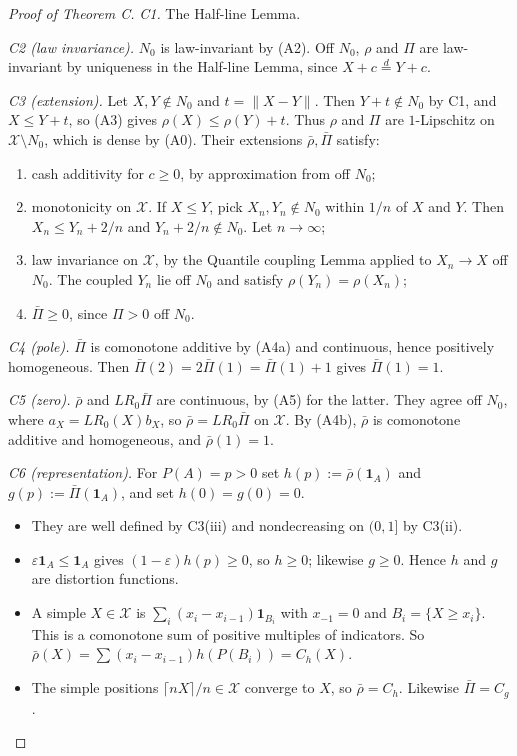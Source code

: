 \begin{proof}[Proof of Theorem C]
\emph{C1.} The Half-line Lemma.

\emph{C2 (law invariance).} $N_0$ is law-invariant by (A2). Off $N_0$, $\rho$ and $\Pi$ are law-invariant by uniqueness in the Half-line Lemma, since $X+c\overset d=Y+c$.

\emph{C3 (extension).} Let $X,Y\notin N_0$ and $t=\|X-Y\|$. Then $Y+t\notin N_0$ by C1, and $X\le Y+t$, so (A3) gives $\rho(X)\le\rho(Y)+t$. Thus $\rho$ and $\Pi$ are $1$-Lipschitz on $\mathcal X\setminus N_0$, which is dense by (A0). Their extensions $\bar\rho,\bar\Pi$ satisfy:
\begin{enumerate}
\item[(i)] cash additivity for $c\ge0$, by approximation from off $N_0$;
\item[(ii)] monotonicity on $\mathcal X$. If $X\le Y$, pick $X_n,Y_n\notin N_0$ within $1/n$ of $X$ and $Y$. Then $X_n\le Y_n+2/n$ and $Y_n+2/n\notin N_0$. Let $n\to\infty$;
\item[(iii)] law invariance on $\mathcal X$, by the Quantile coupling Lemma applied to $X_n\to X$ off $N_0$. The coupled $Y_n$ lie off $N_0$ and satisfy $\rho(Y_n)=\rho(X_n)$;
\item[(iv)] $\bar\Pi\ge0$, since $\Pi>0$ off $N_0$.
\end{enumerate}

\emph{C4 (pole).} $\bar\Pi$ is comonotone additive by (A4a) and continuous, hence positively homogeneous. Then $\bar\Pi(2)=2\bar\Pi(1)=\bar\Pi(1)+1$ gives $\bar\Pi(1)=1$.

\emph{C5 (zero).} $\bar\rho$ and $LR_0\bar\Pi$ are continuous, by (A5) for the latter. They agree off $N_0$, where $a_X=LR_0(X)b_X$, so $\bar\rho=LR_0\bar\Pi$ on $\mathcal X$. By (A4b), $\bar\rho$ is comonotone additive and homogeneous, and $\bar\rho(1)=1$.

\emph{C6 (representation).} For $P(A)=p>0$ set $h(p):=\bar\rho(\mathbf 1_A)$ and $g(p):=\bar\Pi(\mathbf 1_A)$, and set $h(0)=g(0)=0$.
\begin{itemize}
\item They are well defined by C3(iii) and nondecreasing on $(0,1]$ by C3(ii).
\item $\varepsilon\mathbf 1_A\le\mathbf 1_A$ gives $(1-\varepsilon)h(p)\ge0$, so $h\ge0$; likewise $g\ge0$. Hence $h$ and $g$ are distortion functions.
\item A simple $X\in\mathcal X$ is $\sum_i(x_i-x_{i-1})\mathbf 1_{B_i}$ with $x_{-1}=0$ and $B_i=\{X\ge x_i\}$. This is a comonotone sum of positive multiples of indicators. So $\bar\rho(X)=\sum(x_i-x_{i-1})h(P(B_i))=C_h(X)$.
\item The simple positions $\lceil nX\rceil/n\in\mathcal X$ converge to $X$, so $\bar\rho=C_h$. Likewise $\bar\Pi=C_g$.
\end{itemize}


\end{proof}
